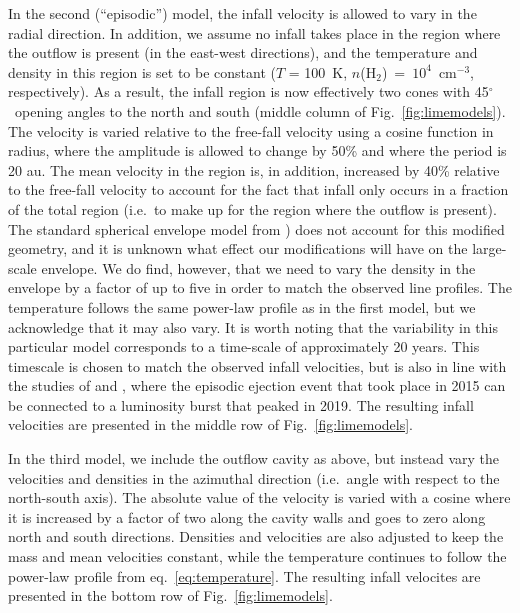 \documentclass{aa}
\newcommand{\cmthree}{cm$^{-3}$}
\newcommand{\expo}[1]{$10^{#1}$}
\newcommand{\nhtva}{$n$($\mathrm{H_2}$)}           %
\newcommand{\adeg}{$^{\circ}$}
\begin{document}
In the second (``episodic'') model, the infall velocity is allowed to vary in the radial direction. In addition, we assume no infall takes place in the region where the outflow is present (in the east-west directions), and the temperature and density in this region is set to be constant ($T$ = 100~K, \nhtva~=~\expo{4}~\cmthree, respectively). As a result, the infall region is now effectively two cones with 45\adeg~opening angles to the north and south (middle column of Fig.\ \ref{fig:limemodels}). The velocity is varied relative to the free-fall velocity using a cosine function in radius, where the amplitude is allowed to change by 50\% and where the period is 20 au. The mean velocity in the region is, in addition, increased by 40\% relative to the free-fall velocity to account for the fact that infall only occurs in a fraction of the total region (i.e.\ to make up for the region where the outflow is present). The standard spherical envelope model from \citet{Kristensen:2012kx}) does not account for this modified geometry, and it is unknown what effect our modifications will have on the large-scale envelope. We do find, however, that we need to vary the density in the envelope by a factor of up to five in order to match the observed line profiles. 
The temperature follows the same power-law profile as in the first model, but we acknowledge that it may also vary. It is worth noting that the variability in this particular model corresponds to a time-scale of approximately 20 years. This timescale is chosen to match the observed infall velocities, but is also in line with the studies of  \citet{Bjerkeli:2019ip} and \citet{Evans:2023aa}, where the episodic ejection event that took place in 2015 can be connected to a luminosity burst that peaked in 2019. The resulting infall velocities are presented in the middle row of Fig.~\ref{fig:limemodels}.

In the third model, we include the outflow cavity as above, but instead vary the velocities and densities in the azimuthal direction (i.e.\ angle with respect to the north-south axis). The absolute value of the velocity is varied with a cosine where it is increased by a factor of two along the cavity walls and goes to zero along north and south directions. Densities and velocities are also adjusted to keep the mass and mean velocities constant, while the temperature continues to follow the power-law profile from eq.\ \ref{eq:temperature}. The resulting infall velocites are presented in the bottom row of Fig.\ \ref{fig:limemodels}.
\end{document}
